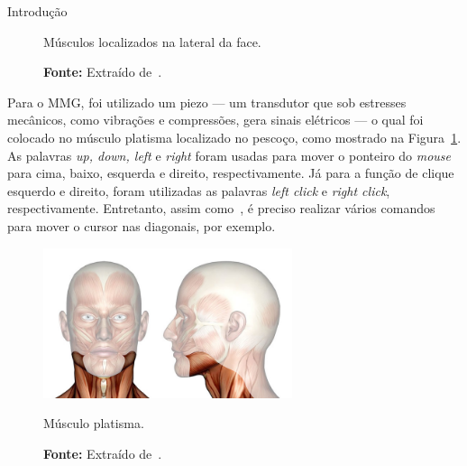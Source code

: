 \begin{chapter}{Introdução}
\begin{figure}
	\centering
	\quad
	\caption{Músculos localizados na lateral da face.}
	\vspace{-1cm}
	\caption*{\textbf{Fonte: }Extraído de~\cite{musculo}.}
\end{figure}

Para o MMG, foi utilizado um piezo --- um transdutor que sob estresses
mecânicos, como vibrações e compressões, gera sinais elétricos --- o qual foi
colocado no músculo platisma localizado no pescoço, como mostrado na
Figura~\ref{fig:platisma}. As palavras \textit{up, down, left} e \textit{right}
foram usadas para mover o ponteiro do \textit{mouse} para cima, baixo, esquerda
e direito, respectivamente. Já para a função de clique esquerdo e direito, foram
utilizadas as palavras \textit{left click} e \textit{right click},
respectivamente. Entretanto, assim como~\cite{Karimullah02}, é preciso realizar
vários comandos para mover o cursor nas diagonais, por exemplo.
\begin{figure}[!h]
	\centering
	\includegraphics[width=0.65\textwidth]{fig/platisma}
	\caption{Músculo platisma.}
	\vspace{-1.0cm}
	\caption*{\textbf{Fonte: }Extraído de~\cite{musculo}.}
	\label{fig:platisma}
\end{figure}


\end{chapter}

